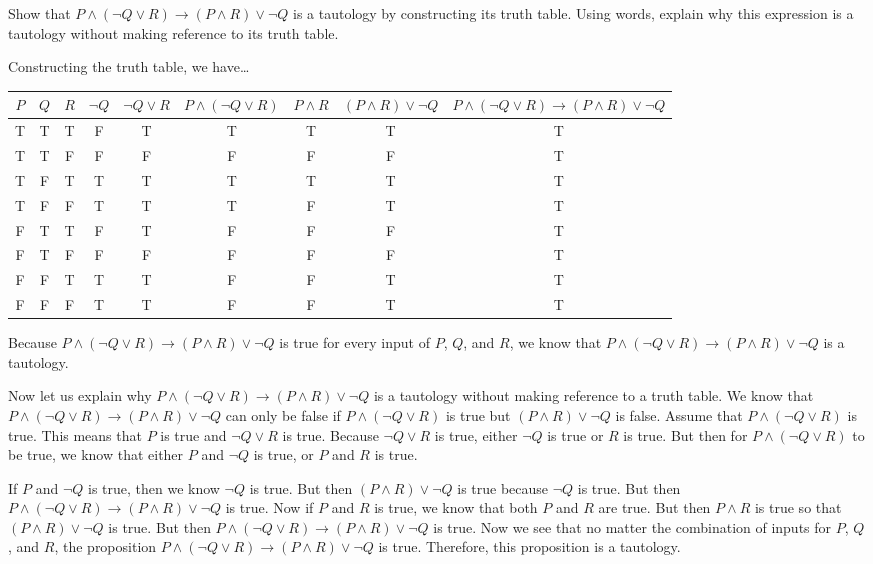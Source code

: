 \documentclass[11pt,letterpaper]{article}
\begin{document}

 Show that $P \wedge (\neg Q \vee R) \to (P \wedge R) \vee \neg Q$ is a tautology by constructing its truth table. Using words, explain why this expression is a tautology without making reference to its truth table. \pspace

\sol Constructing the truth table, we have\dots \par
	\begin{table}[!ht]
	\centering
	\begin{tabular}{ccc||ccc|cc||c}
	$P$ & $Q$ & $R$ & $\neg Q$ & $\neg Q \vee R$ & $P \wedge (\neg Q \vee R)$ & $P \wedge R$ & $(P \wedge R) \vee \neg Q$ & $P \wedge (\neg Q \vee R) \to (P \wedge R) \vee \neg Q$ \\ \hline
	T & T & T & F & T & T & T & T & T \\
	T & T & F & F & F & F & F & F & T \\
	T & F & T & T & T & T & T & T & T \\
	T & F & F & T & T & T & F & T & T \\
	F & T & T & F & T & F & F & F & T \\
	F & T & F & F & F & F & F & F & T \\
	F & F & T & T & T & F & F & T & T \\
	F & F & F & T & T & F & F & T & T
	\end{tabular}
	\end{table} \par
Because $P \wedge (\neg Q \vee R) \to (P \wedge R) \vee \neg Q$ is true for every input of $P$, $Q$, and $R$, we know that $P \wedge (\neg Q \vee R) \to (P \wedge R) \vee \neg Q$ is a tautology. \pspace

Now let us explain why $P \wedge (\neg Q \vee R) \to (P \wedge R) \vee \neg Q$ is a tautology without making reference to a truth table. We know that $P \wedge (\neg Q \vee R) \to (P \wedge R) \vee \neg Q$ can only be false if $P \wedge (\neg Q \vee R)$ is true but $(P \wedge R) \vee \neg Q$ is false. Assume that $P \wedge (\neg Q \vee R)$ is true. This means that $P$ is true and $\neg Q \vee R$ is true. Because $\neg Q \vee R$ is true, either $\neg Q$ is true or $R$ is true. But then for $P \wedge (\neg Q \vee R)$ to be true, we know that either $P$ and $\neg Q$ is true, or $P$ and $R$ is true. \pspace

If $P$ and $\neg Q$ is true, then we know $\neg Q$ is true. But then $(P \wedge R) \vee \neg Q$ is true because $\neg Q$ is true. But then $P \wedge (\neg Q \vee R) \to (P \wedge R) \vee \neg Q$ is true. Now if $P$ and $R$ is true, we know that both $P$ and $R$ are true. But then $P \wedge R$ is true so that $(P \wedge R) \vee \neg Q$ is true. But then $P \wedge (\neg Q \vee R) \to (P \wedge R) \vee \neg Q$ is true. Now we see that no matter the combination of inputs for $P$, $Q$, and $R$, the proposition $P \wedge (\neg Q \vee R) \to (P \wedge R) \vee \neg Q$ is true. Therefore, this proposition is a tautology. 
\end{document}
